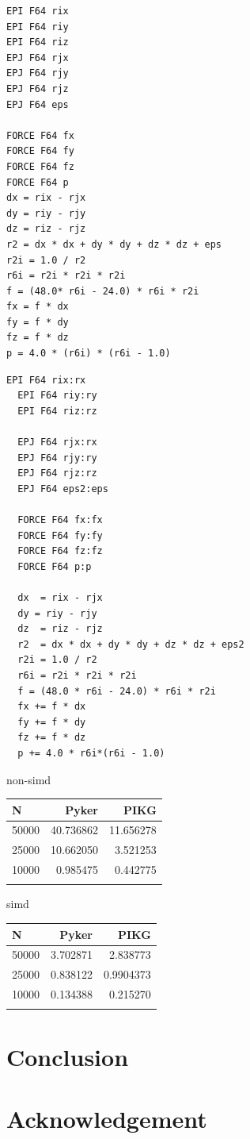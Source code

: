 \documentclass[ams, a4j]{U-AizuGT}
\begin{document}
\begin{lstlisting}[frame=single, caption=LennardJones-kernel.pyker, label=LennardJones-kernel.pyker]
EPI F64 rix
EPI F64 riy
EPI F64 riz
EPJ F64 rjx
EPJ F64 rjy
EPJ F64 rjz
EPJ F64 eps

FORCE F64 fx
FORCE F64 fy
FORCE F64 fz
FORCE F64 p
dx = rix - rjx
dy = riy - rjy
dz = riz - rjz
r2 = dx * dx + dy * dy + dz * dz + eps
r2i = 1.0 / r2
r6i = r2i * r2i * r2i
f = (48.0* r6i - 24.0) * r6i * r2i
fx = f * dx
fy = f * dy
fz = f * dz
p = 4.0 * (r6i) * (r6i - 1.0)
\end{lstlisting}
\begin{lstlisting}[frame=single, caption=LennardJones-kernel.pyker, label=LennardJones-kernel.pyker]
  EPI F64 rix:rx
  EPI F64 riy:ry
  EPI F64 riz:rz
  
  EPJ F64 rjx:rx
  EPJ F64 rjy:ry
  EPJ F64 rjz:rz
  EPJ F64 eps2:eps
  
  FORCE F64 fx:fx
  FORCE F64 fy:fy
  FORCE F64 fz:fz
  FORCE F64 p:p
  
  dx  = rix - rjx
  dy = riy - rjy
  dz  = riz - rjz
  r2  = dx * dx + dy * dy + dz * dz + eps2
  r2i = 1.0 / r2
  r6i = r2i * r2i * r2i
  f = (48.0 * r6i - 24.0) * r6i * r2i
  fx += f * dx
  fy += f * dy
  fz += f * dz
  p += 4.0 * r6i*(r6i - 1.0)

\end{lstlisting}


non-simd
\begin{tabular}{|l|r|r|} \hline
  N & Pyker & PIKG \\ \hline
  50000 & 40.736862 & 11.656278 \\
  25000 & 10.662050 & 3.521253 \\
  10000 & 0.985475 & 0.442775 \\
 \\ \hline
\end{tabular}


simd
\begin{tabular}{|l|r|r|} \hline
  N & Pyker & PIKG \\ \hline
  50000 & 3.702871  & 2.838773\\
  25000 & 0.838122 & 0.9904373 \\
  10000 & 0.134388 & 0.215270 \\

 \\ \hline
\end{tabular}



\section{Conclusion}
\section{Acknowledgement}

\begin{thebibliography}{99}
\end{thebibliography}

\end{document}
